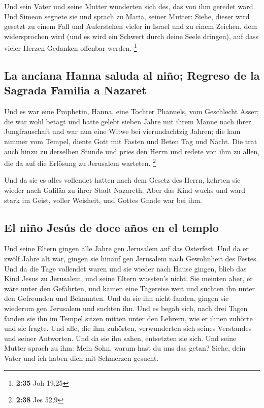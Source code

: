  Und sein Vater und seine Mutter wunderten sich des, das
von ihm geredet ward.  Und Simeon segnete sie und sprach
zu Maria, seiner Mutter: Siehe, dieser wird gesetzt zu einem Fall und
Auferstehen vieler in Israel und zu einem Zeichen, dem widersprochen
wird  (und es wird ein Schwert durch deine Seele
dringen), auf dass vieler Herzen Gedanken offenbar werden. \footnote{\textbf{2:35}
  Joh 19,25}

\hypertarget{la-anciana-hanna-saluda-al-niuxf1o-regreso-de-la-sagrada-familia-a-nazaret}{%
\subsection{La anciana Hanna saluda al niño; Regreso de la Sagrada
Familia a
Nazaret}\label{la-anciana-hanna-saluda-al-niuxf1o-regreso-de-la-sagrada-familia-a-nazaret}}

 Und es war eine Prophetin, Hanna, eine Tochter Phanuels,
vom Geschlecht Asser; die war wohl betagt und hatte gelebt sieben Jahre
mit ihrem Manne nach ihrer Jungfrauschaft  und war nun
eine Witwe bei vierundachtzig Jahren; die kam nimmer vom Tempel, diente
Gott mit Fasten und Beten Tag und Nacht.  Die trat auch
hinzu zu derselben Stunde und pries den Herrn und redete von ihm zu
allen, die da auf die Erlösung zu Jerusalem warteten. \footnote{\textbf{2:38}
  Jes 52,9}

 Und da sie es alles vollendet hatten nach dem Gesetz des
Herrn, kehrten sie wieder nach Galiläa zu ihrer Stadt Nazareth.
 Aber das Kind wuchs und ward stark im Geist, voller
Weisheit, und Gottes Gnade war bei ihm.

\hypertarget{el-niuxf1o-jesuxfas-de-doce-auxf1os-en-el-templo}{%
\subsection{El niño Jesús de doce años en el
templo}\label{el-niuxf1o-jesuxfas-de-doce-auxf1os-en-el-templo}}

 Und seine Eltern gingen alle Jahre gen Jerusalem auf das
Osterfest.  Und da er zwölf Jahre alt war, gingen sie
hinauf gen Jerusalem nach Gewohnheit des Festes.  Und da
die Tage vollendet waren und sie wieder nach Hause gingen, blieb das
Kind Jesus zu Jerusalem, und seine Eltern wussten's nicht.
 Sie meinten aber, er wäre unter den Gefährten, und kamen
eine Tagereise weit und suchten ihn unter den Gefreunden und Bekannten.
 Und da sie ihn nicht fanden, gingen sie wiederum gen
Jerusalem und suchten ihn.  Und es begab sich, nach drei
Tagen fanden sie ihn im Tempel sitzen mitten unter den Lehrern, wie er
ihnen zuhörte und sie fragte.  Und alle, die ihm
zuhörten, verwunderten sich seines Verstandes und seiner Antworten.
 Und da sie ihn sahen, entsetzten sie sich. Und seine
Mutter sprach zu ihm: Mein Sohn, warum hast du uns das getan? Siehe,
dein Vater und ich haben dich mit Schmerzen gesucht.

